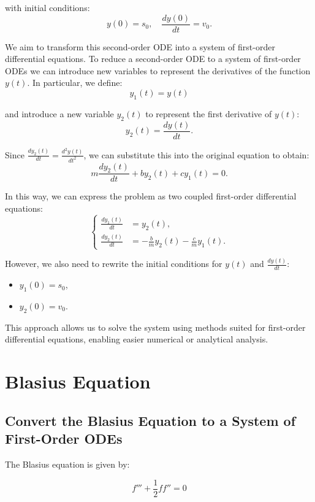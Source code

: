 \documentclass{article}
\begin{document}
with initial conditions:
\[
y(0) = s_0, \quad \frac{dy(0)}{dt} = v_0.
\]

We aim to transform this second-order ODE into a system of first-order differential equations. To reduce a second-order ODE to a 
system of first-order ODEs we can introduce new variables to represent the derivatives of the function \( y(t) \). 
In particular, we define:
\[
y_1(t) = y(t)
\]

and introduce a new variable \( y_2(t) \) to represent the first derivative of \( y(t) \):
\[
y_2(t) = \frac{dy(t)}{dt}.
\]

Since \( \frac{dy_2(t)}{dt} = \frac{d^2 y(t)}{dt^2} \), we can substitute this into the original equation to obtain:
\begin{equation}
m \frac{dy_2(t)}{dt} + b y_2(t) + c y_1(t) = 0.
\end{equation}

In this way, we can express the problem as two coupled first-order differential equations:
\[
\begin{cases}
\frac{dy_1(t)}{dt} &= y_2(t), \\
\frac{dy_2(t)}{dt} &= -\frac{b}{m} y_2(t) - \frac{c}{m} y_1(t).
\end{cases}
\]

However, we also need to rewrite the initial conditions for \( y(t) \) and \( \frac{dy(t)}{dt} \):
\begin{itemize}
    \item \( y_1(0) = s_0 \),
    \item \( y_2(0) = v_0 \).
\end{itemize}

This approach allows us to solve the system using methods suited for first-order differential equations, enabling easier numerical or analytical analysis.






\section{Blasius Equation}

\subsection{Convert the Blasius Equation to a System of First-Order ODEs}

The Blasius equation is given by:

\begin{equation}
f''' + \frac{1}{2} f f'' = 0
\end{equation}
\end{document}
